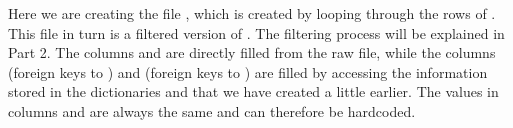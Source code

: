 \documentclass[letterpaper,10pt,english]{sphinxmanual}
\begin{document}
\sphinxAtStartPar
Here we are creating the file , which is created by looping
through the rows of . This file in turn is a filtered
version of . The filtering process will be
explained in Part 2. The columns   
and  are directly filled from the raw file, while the columns
 (foreign keys to ) and 
(foreign keys to ) are filled by accessing the information
stored in the dictionaries  and  that we have created
a little earlier. The values in columns  and  are
always the same and can therefore be hard\sphinxhyphen{}coded.
\end{document}
